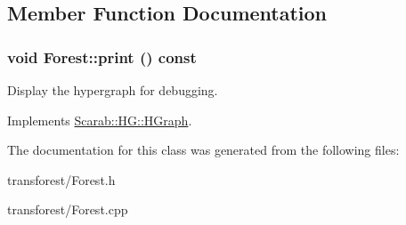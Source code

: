 \subsection{Member Function Documentation}
\hypertarget{class_forest_a621a1a65d0f877bb33b15c79f9e24c4d}{
\subsubsection[{print}]{\setlength{\rightskip}{0pt plus 5cm}void Forest::print () const}}
\label{class_forest_a621a1a65d0f877bb33b15c79f9e24c4d}
Display the hypergraph for debugging. 

Implements \hyperlink{class_scarab_1_1_h_g_1_1_h_graph_ab5aa11c932b28864b56f28e0babbc1c1}{Scarab::HG::HGraph}.



The documentation for this class was generated from the following files:\begin{DoxyCompactItemize}
\item 
transforest/Forest.h\item 
transforest/Forest.cpp\end{DoxyCompactItemize}
